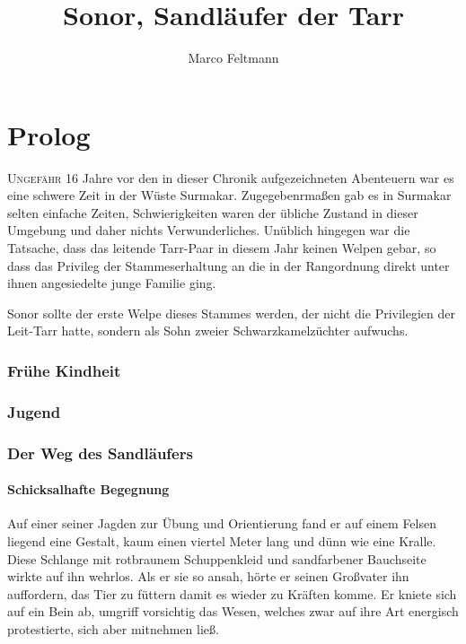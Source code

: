 \documentclass[a4paper]{scrreprt}
\author{Marco Feltmann}
\title{ {Sonor}, Sandläufer der Tarr }
\def\capitalsfont{\usefont{U}{AnnSton}{xl}{n}\selectfont}
\newcommand{\capital}[2]{\lettrine[lines=8]{\capitalsfont #1}{#2}}
\begin{document}
	\maketitle
	
	\tableofcontents

	\part{Prolog}
	
	\capital{U}{ngefähr} 16 Jahre vor den in dieser Chronik aufgezeichneten Abenteuern war es eine schwere Zeit in der Wüste Surmakar. Zugegebenrmaßen gab es in Surmakar selten einfache Zeiten, Schwierigkeiten waren der übliche Zustand in dieser Umgebung und daher nichts Verwunderliches. 
	Unüblich hingegen war die Tatsache, dass das leitende Tarr-Paar in diesem Jahr keinen Welpen gebar, so dass das Privileg der Stammeserhaltung an die in der Rangordnung direkt unter ihnen angesiedelte junge Familie ging.
	
	Sonor sollte der erste Welpe dieses Stammes werden, der nicht die Privilegien der Leit-Tarr hatte, sondern als Sohn zweier Schwarzkamelzüchter aufwuchs.

	
	\section{Frühe Kindheit}
	
	\section{Jugend}
	
	\section{Der Weg des Sandläufers}
	\subsection{Schicksalhafte Begegnung}
	Auf einer seiner Jagden zur Übung und Orientierung fand er auf einem Felsen liegend eine Gestalt, kaum einen viertel Meter lang und dünn wie eine Kralle. Diese Schlange mit rotbraunem Schuppenkleid und sandfarbener Bauchseite wirkte auf ihn wehrlos.
	Als er sie so ansah, hörte er seinen Großvater ihn auffordern, das Tier zu füttern damit es wieder zu Kräften komme.
	Er kniete sich auf ein Bein ab, umgriff vorsichtig das Wesen, welches zwar auf ihre Art energisch protestierte, sich aber mitnehmen ließ.
	
\end{document}
